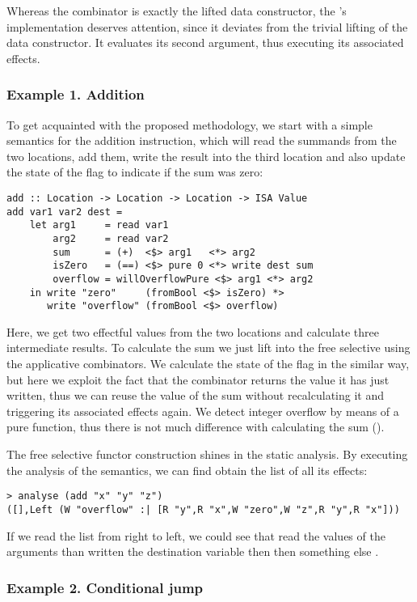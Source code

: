 Whereas the  combinator is exactly the lifted  data constructor, the 's implementation deserves attention, since it deviates from the trivial lifting of
the  data constructor. It evaluates its second argument, thus executing its
associated effects.

\subsubsection{Example 1. Addition}

To get acquainted with the proposed methodology, we start with a simple semantics for
the addition instruction, which will read the summands from the two locations, add them,
write the result into the third location and also update the state of the 
flag to indicate if the sum was zero:

\begin{verbatim}
add :: Location -> Location -> Location -> ISA Value
add var1 var2 dest =
    let arg1     = read var1
        arg2     = read var2
        sum      = (+)  <$> arg1   <*> arg2
        isZero   = (==) <$> pure 0 <*> write dest sum
        overflow = willOverflowPure <$> arg1 <*> arg2
    in write "zero"     (fromBool <$> isZero) *>
       write "overflow" (fromBool <$> overflow)
\end{verbatim}

Here, we get two effectful values from the two locations and calculate three intermediate
results. To calculate the sum we just lift \hs{+} into the free selective using the applicative
combinators. We calculate the state of the  flag in the similar way, but here we
exploit the fact that the  combinator returns the value it has just written, thus we
can reuse the value of the sum without recalculating it and triggering its associated effects
again. We detect integer overflow by means of a pure function, thus there is not much difference
with calculating the sum ().

The free selective functor construction shines in the static analysis. By executing
the analysis of the  semantics, we can find obtain the list of all its effects:
\begin{verbatim}
> analyse (add "x" "y" "z")
([],Left (W "overflow" :| [R "y",R "x",W "zero",W "z",R "y",R "x"]))
\end{verbatim}
If we read the list from right to left, we could see that  read the values of the
arguments than written the destination variable then then something else .

\subsubsection{Example 2. Conditional jump}



